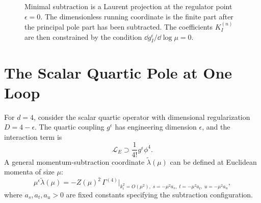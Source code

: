 \begin{figure}[H]
  \centering
  \caption[Minimal-subtraction coordinate and pole data]{Minimal subtraction
  is a Laurent projection at the regulator point \(\epsilon=0\).  The
  dimensionless running coordinate is the finite part after the principal
  pole part has been subtracted.  The coefficients \(K_I^{(n)}\) are then
  constrained by the condition
  \(\dd g_I^\epsilon/\dd\log\mu=0\).}
  \label{fig:volume-ii-ms-coordinate-structure}
\end{figure}

\section{The Scalar Quartic Pole at One Loop}
\label{sec:volume-ii-scalar-quartic-pole-one-loop}

For \(d=4\), consider the scalar quartic operator with dimensional
regularization \(D=4-\epsilon\).  The quartic coupling \(g^\epsilon\) has
engineering dimension \(\epsilon\), and the interaction term is
\[
  \mathcal L_E\supset \frac1{4!}g^\epsilon\phi^4 .
\]
A general momentum-subtraction coordinate
\(\widetilde\lambda(\mu)\) can be defined at Euclidean momenta of size
\(\mu\):
\[
  \mu^\epsilon \widetilde\lambda(\mu)
  =
  -Z(\mu)^2\,
  \Gamma^{(4)}
  \bigg|_{k_i^2=O(\mu^2),\;
  s=-\mu^2a_s,\;t=-\mu^2a_t,\;u=-\mu^2a_u},
\]
where \(a_s,a_t,a_u>0\) are fixed constants specifying the subtraction
configuration.


